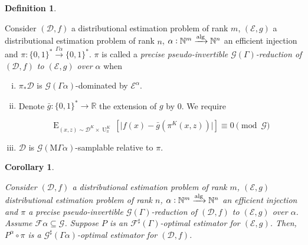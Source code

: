 \documentclass{article}
\numberwithin{equation}{section}
\theoremstyle{definition}
\newtheorem{definition}{Definition}[section]
\theoremstyle{plain}
\newtheorem{corollary}{Corollary}[section]
\newcommand{\Bool}{\{0,1\}}
\newcommand{\Words}{{\Bool^*}}
\DeclareMathOperator{\E}{E}
\DeclareMathOperator{\Un}{U}
\newcommand{\Nats}{\mathbb{N}}
\newcommand{\Reals}{\mathbb{R}}
\newcommand{\Abs}[1]{\lvert #1 \rvert}
\newcommand{\Dist}{\mathcal{D}}
\newcommand{\MGrow}{\mathrm{M}\Gamma}
\newcommand{\Fall}{\mathcal{F}}
\newcommand{\ESG}{\Fall^\sharp(\Gamma)}
\newcommand{\Alg}{\xrightarrow{\textnormal{alg}}}
\begin{document}
\begin{samepage}
\begin{definition}
\label{def:pp_reduce}

Consider $(\Dist,f)$ a distributional estimation problem of rank ${m}$, $(\mathcal{E},g)$ a distributional estimation problem of rank ${n}$, ${\alpha: \Nats^m \Alg \Nats^n}$ an efficient injection and ${\pi: \Words \xrightarrow{\Gamma \alpha} \Words}$. $\pi$ is called a \emph{precise pseudo-invertible $\mathcal{G}(\Gamma)$-reduction of $(\Dist,f)$ to $(\mathcal{E},g)$ over ${\alpha}$} when

\begin{enumerate}[(i)]

\item\label{con:def__pp_reduce__dist} ${\pi_*\Dist}$ is ${\mathcal{G}(\Gamma \alpha)}$-dominated by ${\mathcal{E}^\alpha}$.

\item\label{con:def__pp_reduce__fun} Denote ${\bar{g}: \Words \rightarrow \Reals}$ the extension of $g$ by 0. We require

\[\E_{(x,z) \sim \Dist^{K} \times \Un_\pi^{K}}[\Abs{f(x)-\bar{g}(\pi^{K}(x,z))}] \equiv 0 \pmod {\mathcal{G}}\]

\item\label{con:def__pp_reduce__smp} $\Dist$ is $\mathcal{G}(\MGrow \alpha)$-samplable relative to $\pi$.

\end{enumerate}

\end{definition}
\end{samepage}

\begin{samepage}
\begin{corollary}
\label{crl:pp_reduce_sharp}

Consider $(\Dist,f)$ a distributional estimation problem of rank ${m}$, $(\mathcal{E},g)$ distributional estimation problem of rank ${n}$, ${\alpha: \Nats^m \Alg \Nats^n}$ an efficient injection and $\pi$ a precise pseudo-invertible $\mathcal{G}(\Gamma)$-reduction of $(\Dist, f)$ to $(\mathcal{E}, g)$ over ${\alpha}$. Assume ${\Fall\alpha \subseteq \mathcal{G}}$. Suppose $P$ is an $\ESG$-optimal estimator for $(\mathcal{E}, g)$. Then, $P^\alpha \circ \pi$ is a $\mathcal{G}^\sharp (\Gamma \alpha)$-optimal estimator for $(\Dist, f)$.

\end{corollary}
\end{samepage}
\end{document}
